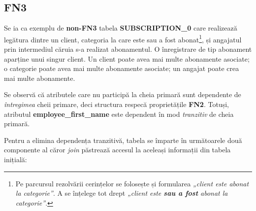 \documentclass[a4paper, oneside, 12pt]{article}
\newcommand{\rowstyle}[1]{\gdef\currentrowstyle{#1}%
  #1\ignorespaces
}
\begin{document}
\begin{table}[H]
\centering
\caption*{Tabela \textbf{GROUP\_MEMBER\_2}:}
\end{table}

\subsection{FN3}

Se ia ca exemplu de \textbf{non-FN3} tabela \textbf{SUBSCRIPTION\_0} care
realizează legătura dintre un client, categoria la care este sau a fost
abonat\footnote{Pe parcursul rezolvării cerințelor se folosește și formularea
\emph{„client este abonat la categorie”}. A se înțelege tot drept \emph{„client
este \textbf{sau a fost} abonat la categorie”}.}, și angajatul prin intermediul
căruia s-a realizat abonamentul. O înregistrare de tip abonament aparține unui
singur client. Un client poate avea mai multe abonamente asociate; o categorie
poate avea mai multe abonamente asociate; un angajat poate crea mai multe
abonamente.


\begin{table}[H]
\centering
\caption*{Tabela \textbf{SUBSCRIPTION\_0}:}
\end{table}

Se observă că atributele care nu participă la cheia primară sunt dependente de
\emph{întregimea} cheii primare, deci structura respecă proprietățile \textbf{FN2}.
Totuși, atributul \textbf{employee\_first\_name} este dependent în mod
\emph{tranzitiv} de cheia primară.

Pentru a elimina dependența tranzitivă, tabela se împarte în următoarele două
componente al căror \emph{join} păstrează accesul la aceleași informații din
tabela inițială:
\end{document}
